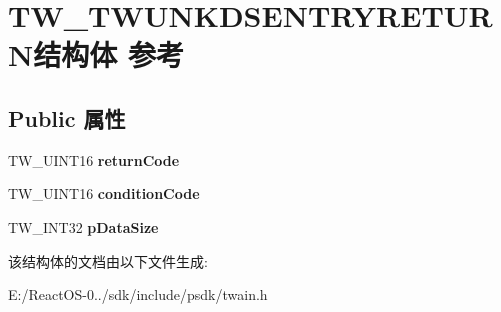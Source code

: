 \hypertarget{struct_t_w___t_w_u_n_k_d_s_e_n_t_r_y_r_e_t_u_r_n}{}\section{T\+W\+\_\+\+T\+W\+U\+N\+K\+D\+S\+E\+N\+T\+R\+Y\+R\+E\+T\+U\+R\+N结构体 参考}
\label{struct_t_w___t_w_u_n_k_d_s_e_n_t_r_y_r_e_t_u_r_n}
\subsection*{Public 属性}
\begin{DoxyCompactItemize}
\item 
\mbox{\label{struct_t_w___t_w_u_n_k_d_s_e_n_t_r_y_r_e_t_u_r_n_ae085f3143d59198721e3fb1a2bed318e}} 
T\+W\+\_\+\+U\+I\+N\+T16 {\bfseries return\+Code}
\item 
\mbox{\label{struct_t_w___t_w_u_n_k_d_s_e_n_t_r_y_r_e_t_u_r_n_a2041314dda65afb8e4eab27e6e4f4da5}} 
T\+W\+\_\+\+U\+I\+N\+T16 {\bfseries condition\+Code}
\item 
\mbox{\label{struct_t_w___t_w_u_n_k_d_s_e_n_t_r_y_r_e_t_u_r_n_a00bc7de433650575ad83ccd82da3f2f8}} 
T\+W\+\_\+\+I\+N\+T32 {\bfseries p\+Data\+Size}
\end{DoxyCompactItemize}


该结构体的文档由以下文件生成\+:\begin{DoxyCompactItemize}
\item 
E\+:/\+React\+O\+S-\/0../sdk/include/psdk/twain.\+h\end{DoxyCompactItemize}
